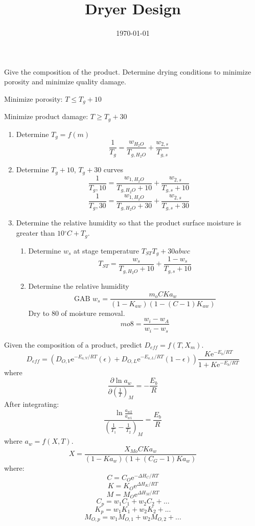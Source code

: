 \documentclass[11pt]{article}
\newcommand{\degree}{\ensuremath{^\circ}}
\newcommand{\e}{\ensuremath{\text{e}}}
\begin{document}
\title{Dryer Design}
\date{\today}
\maketitle

Give the composition of the product. Determine drying conditions to minimize porosity and minimize quality damage.

Minimize porosity: $T \le T_g + 10$

Minimize product damage: $T \ge T_g + 30$

\begin{enumerate}
\item Determine $T_g = f(m)$
\[\frac{1}{T_g} = \frac{w_{H_2O}}{T_{g,H_2O}} + \frac{w_{2,s}}{T_{g,s}} \]

\item Determine $T_g+10$, $T_g+30$ curves
\[\frac{1}{T_g,10} = \frac{w_{1,H_2O}}{T_{g,H_2O}+10} + \frac{w_{2,s}}{T_{g,s}+10}\]
\[\frac{1}{T_g,30} = \frac{w_{1,H_2O}}{T_{g,H_2O}+30} + \frac{w_{2,s}}{T_{g,s}+30}\]

\item Determine the relative humidity so that the product surface moisture is greater than $10\degree C + T_g$.
\begin{enumerate}
\item Determine $w_s$ at stage temperature $T_{ST} T_g+30 ab wc$
\[T_{ST} = \frac{w_s}{T_{g,H_2O}+10} + \frac{1-w_s}{T_{g,s}+10}\]
\item Determine the relative humidity
\[\text{GAB } w_s = \frac{m_oCKa_w}{(1-K_{aw})(1-(C-1)K_{aw})}\]
Dry to 80 of moisture removal.
\[mo8 = \frac{w_i-w_A}{w_i-w_s}\]
\end{enumerate}

\end{enumerate}

Given the composition of a product, predict $D_{eff} = f(T, X_m)$.
\[D_{eff} = \left(D_{O,V} \e^{-E_{a,V}/RT}(\epsilon)
+ D_{O,L} \e^{-E_{a,L}/RT}(1-\epsilon)\right)
\frac{K\e^{-E_b/RT}}{1+K\e^{-E_b/RT}}\]
where
\[\frac{\partial \ln a_w}{\partial \left(\frac{1}{T}\right)_M} = -\frac{E_b}{R}\]
After integrating:
\[\frac{\ln\frac{a_{w2}}{a_{w1}}}{\left(\frac{1}{T_1}-\frac{1}{T_2}\right)_M} = \frac{E_b}{R}\]
where $a_w = f(X, T)$.
\[X = \frac{X_{Mo}CKa_w}{(1-Ka_w)(1+(C_G-1)Ka_w)}\]
where:
\[C = C_O\e^{-\Delta H_C/RT}\]
\[K = K_O\e^{\Delta H_K/RT}\]
\[M = M_O\e^{\Delta H_M/RT}\]
\[C_p = w_1 C_1 + w_2 C_2 + ...\]
\[K_p = w_1 K_1 + w_2 K_2 + ...\]
\[M_{O,p} = w_1 M_{O,1} + w_2 M_{O,2} + ...\]
\end{document}
